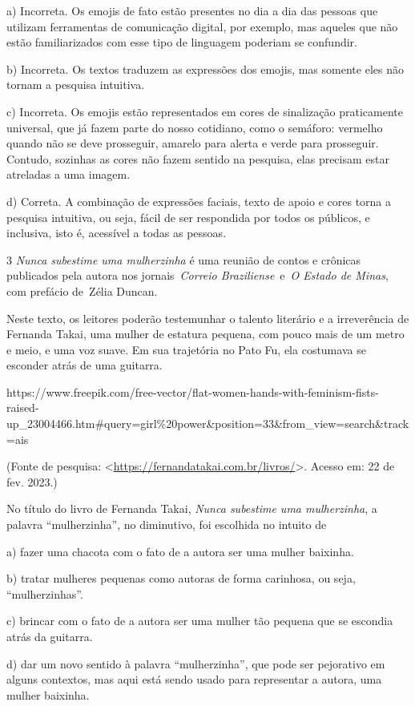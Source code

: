 a) Incorreta. Os emojis de fato estão presentes no dia a dia das pessoas
que utilizam ferramentas de comunicação digital, por exemplo, mas
aqueles que não estão familiarizados com esse tipo de linguagem poderiam
se confundir.

b) Incorreta. Os textos traduzem as expressões dos emojis, mas somente
eles não tornam a pesquisa intuitiva.

c) Incorreta. Os emojis estão representados em cores de sinalização
praticamente universal, que já fazem parte do nosso cotidiano, como o
semáforo: vermelho quando não se deve prosseguir, amarelo para alerta e
verde para prosseguir. Contudo, sozinhas as cores não fazem sentido na
pesquisa, elas precisam estar atreladas a uma imagem.

d) Correta. A combinação de expressões faciais, texto de apoio e cores
torna a pesquisa intuitiva, ou seja, fácil de ser respondida por todos
os públicos, e inclusiva, isto é, acessível a todas as pessoas.

\num{3} \emph{Nunca subestime uma mulherzinha} é uma reunião de contos e
crônicas publicados pela autora nos jornais~\emph{Correio
Braziliense}~e~\emph{O Estado de Minas}, com prefácio de~Zélia Duncan.

Neste texto, os leitores poderão testemunhar o talento literário e a
irreverência de Fernanda Takai, uma mulher de estatura pequena, com
pouco mais de um metro e meio, e uma voz suave. Em sua trajetória no
Pato Fu, ela costumava se esconder atrás de uma guitarra.

https://www.freepik.com/free-vector/flat-women-hands-with-feminism-fists-raised-up\_23004466.htm\#query=girl\%20power\&position=33\&from\_view=search\&track=ais

(Fonte de pesquisa:
\textless{}\url{https://fernandatakai.com.br/livros/}\textgreater.
Acesso em: 22 de fev. 2023.)

No título do livro de Fernanda Takai, \emph{Nunca subestime uma
mulherzinha}, a palavra ``mulherzinha'', no diminutivo, foi escolhida no
intuito de

a) fazer uma chacota com o fato de a autora ser uma mulher baixinha.

b) tratar mulheres pequenas como autoras de forma carinhosa, ou seja,
``mulherzinhas''.

c) brincar com o fato de a autora ser uma mulher tão pequena que se
escondia atrás da guitarra.

d) dar um novo sentido à palavra ``mulherzinha'', que pode ser
pejorativo em alguns contextos, mas aqui está sendo usado para
representar a autora, uma mulher baixinha.

